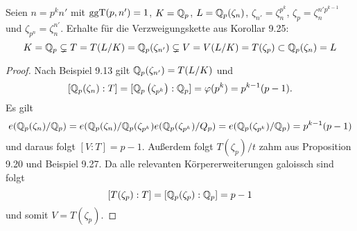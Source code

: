 \begin{Bsp}
	Seien $n=p^kn'$ mit $\operatorname{ggT}(p,n')=1$, $K=\mathbb{Q}_p$, $L=\mathbb{Q}_p(\zeta_n)$, $\zeta_{n'} = \zeta_n^{p^k}$, $\zeta_p = \zeta_n^{n'p^{k-1}}$ und $\zeta_{p^n} = \zeta_n^{n'}$. Erhalte für die Verzweigungskette aus Korollar 9.25:
	\[ K = \mathbb{Q}_p \subsetneq T=T(L/K) = \mathbb{Q}_p(\zeta_{n'}) \subsetneq V=V(L/K)=T(\zeta_p)
	\subset \mathbb{Q}_p(\zeta_n) = L
	\]
\end{Bsp}

\begin{proof}
	Nach Beispiel 9.13 gilt $\mathbb{Q}_p(\zeta_{n'}) = T(L/K)$ und 
	\[ [\mathbb{Q}_p(\zeta_n):T] = [\mathbb{Q}_p\left( \zeta_{p^k} \right) : \mathbb{Q}_p ]
	= \varphi(p^k) = p^{k-1}(p-1).
	\]
	Es gilt
	\[ e(\mathbb{Q}_p(\zeta_n)/\mathbb{Q}_p) = e(\mathbb{Q}_p(\zeta_n) / \mathbb{Q}_p( \zeta_{p^k}) e( \mathbb{Q}_p( \zeta_{p^k} )/ Q_p )
	= e(\mathbb{Q}_p( \zeta_{p^k} )/ \mathbb{Q}_p)
	= p^{k-1}(p-1)
	\]
	und daraus folgt $[V:T] = p-1$.
	Außerdem folgt 
	$T(\zeta_p) /t$ zahm
	aus Proposition 9.20 und Beispiel 9.27.
	Da alle relevanten Körpererweiterungen galoissch  sind folgt
	\[ [T(\zeta_p):T] = [\mathbb{Q}_p(\zeta_p): \mathbb{Q}_p] = p-1
	\]
	und somit $V=T(\zeta_p)$.
\end{proof}